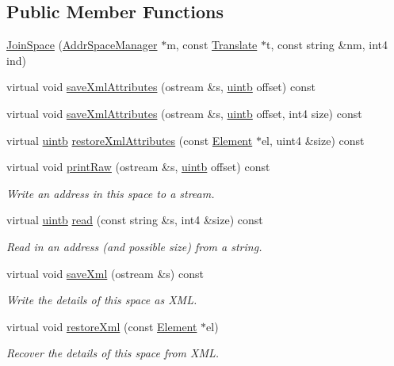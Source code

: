 \subsection*{Public Member Functions}
\begin{DoxyCompactItemize}
\item 
\mbox{\hyperlink{class_join_space_a567ec37c46a6932b744e2f2cf9e790c2}{Join\+Space}} (\mbox{\hyperlink{class_addr_space_manager}{Addr\+Space\+Manager}} $\ast$m, const \mbox{\hyperlink{class_translate}{Translate}} $\ast$t, const string \&nm, int4 ind)
\item 
virtual void \mbox{\hyperlink{class_join_space_a1468359068efe2f1d3fe0c30a4d5ff00}{save\+Xml\+Attributes}} (ostream \&s, \mbox{\hyperlink{types_8h_a2db313c5d32a12b01d26ac9b3bca178f}{uintb}} offset) const
\item 
virtual void \mbox{\hyperlink{class_join_space_aa3674a311764fe483ed0a3b93a3735ca}{save\+Xml\+Attributes}} (ostream \&s, \mbox{\hyperlink{types_8h_a2db313c5d32a12b01d26ac9b3bca178f}{uintb}} offset, int4 size) const
\item 
virtual \mbox{\hyperlink{types_8h_a2db313c5d32a12b01d26ac9b3bca178f}{uintb}} \mbox{\hyperlink{class_join_space_aca1360dbe0abf4a9ace679887cb47c17}{restore\+Xml\+Attributes}} (const \mbox{\hyperlink{class_element}{Element}} $\ast$el, uint4 \&size) const
\item 
virtual void \mbox{\hyperlink{class_join_space_a23032ea3a76390d697779a99d15c75c8}{print\+Raw}} (ostream \&s, \mbox{\hyperlink{types_8h_a2db313c5d32a12b01d26ac9b3bca178f}{uintb}} offset) const
\begin{DoxyCompactList}\small\item\em Write an address in this space to a stream. \end{DoxyCompactList}\item 
virtual \mbox{\hyperlink{types_8h_a2db313c5d32a12b01d26ac9b3bca178f}{uintb}} \mbox{\hyperlink{class_join_space_a8f644b1eaf92bece425a3712a205fa3b}{read}} (const string \&s, int4 \&size) const
\begin{DoxyCompactList}\small\item\em Read in an address (and possible size) from a string. \end{DoxyCompactList}\item 
virtual void \mbox{\hyperlink{class_join_space_a7e7bdd3347396ca62a465041f13e06a1}{save\+Xml}} (ostream \&s) const
\begin{DoxyCompactList}\small\item\em Write the details of this space as X\+ML. \end{DoxyCompactList}\item 
virtual void \mbox{\hyperlink{class_join_space_a55fb2e082c5547f3b4ff4022de86c895}{restore\+Xml}} (const \mbox{\hyperlink{class_element}{Element}} $\ast$el)
\begin{DoxyCompactList}\small\item\em Recover the details of this space from X\+ML. \end{DoxyCompactList}\end{DoxyCompactItemize}
